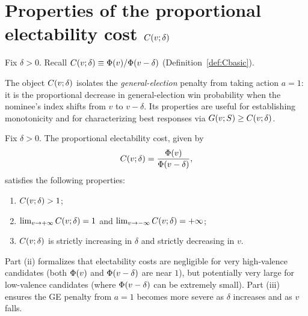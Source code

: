 \section{Properties of the proportional electability cost $C\!\left(v;\delta\right)$}

Fix $\delta>0$. Recall $C\!\left(v;\delta\right)\equiv \Phi(v)/\Phi(v-\delta)$ (Definition~\ref{def:Cbasic}).

The object $C\!\left(v;\delta\right)$ isolates the \emph{general-election} penalty from taking action $a=1$:
it is the proportional decrease in general-election win probability when the nominee's index shifts
from $v$ to $v-\delta$. Its properties are useful for establishing monotonicity and for characterizing
best responses via $G\!\left(v;S\right)\ge C\!\left(v;\delta\right)$.


\begin{lemma}\label{lem:Cbasic}
Fix $\delta > 0$. The proportional electability cost, given by
\[
    C\!\left(v;\delta\right) = \frac{\Phi(v)}{\Phi(v-\delta)},
\]
satisfies the following properties:
\begin{enumerate}
    \item $C\!\left(v;\delta\right) > 1$;
    \item $\lim_{v\to+\infty}C\!\left(v;\delta\right) = 1$ and $\lim_{v\to -\infty} C\!\left(v;\delta\right) = +\infty$;
    \item $C\!\left(v;\delta\right)$ is strictly increasing in $\delta$ and strictly decreasing in $v$.
\end{enumerate}
\end{lemma}


Part (ii) formalizes that electability costs are negligible for very high-valence candidates
(both $\Phi(v)$ and $\Phi(v-\delta)$ are near $1$), but potentially very large for low-valence
candidates (where $\Phi(v-\delta)$ can be extremely small). Part (iii) ensures the GE penalty from
$a=1$ becomes more severe as $\delta$ increases and as $v$ falls.



